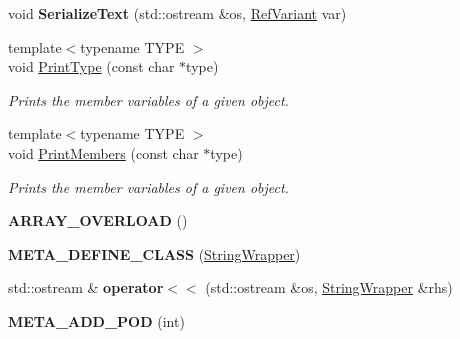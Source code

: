\begin{DoxyCompactItemize}
\item 
\hypertarget{namespaceDCEngine_a82cd4926cc0e797f4f74807cec2d5c18}{void {\bfseries Serialize\-Text} (std\-::ostream \&os, \hyperlink{classDCEngine_1_1RefVariant}{Ref\-Variant} var)}\label{namespaceDCEngine_a82cd4926cc0e797f4f74807cec2d5c18}

\item 
\hypertarget{namespaceDCEngine_ad026ffe481e698f2af8aee4f0810c5b3}{{\footnotesize template$<$typename T\-Y\-P\-E $>$ }\\void \hyperlink{namespaceDCEngine_ad026ffe481e698f2af8aee4f0810c5b3}{Print\-Type} (const char $\ast$type)}\label{namespaceDCEngine_ad026ffe481e698f2af8aee4f0810c5b3}

\begin{DoxyCompactList}\small\item\em Prints the member variables of a given object. \end{DoxyCompactList}\item 
\hypertarget{namespaceDCEngine_a10e521135488a4132ebc8e49b04bbc0a}{{\footnotesize template$<$typename T\-Y\-P\-E $>$ }\\void \hyperlink{namespaceDCEngine_a10e521135488a4132ebc8e49b04bbc0a}{Print\-Members} (const char $\ast$type)}\label{namespaceDCEngine_a10e521135488a4132ebc8e49b04bbc0a}

\begin{DoxyCompactList}\small\item\em Prints the member variables of a given object. \end{DoxyCompactList}\item 
\hypertarget{namespaceDCEngine_a957bc3c9baf7dade57667227593467fa}{{\bfseries A\-R\-R\-A\-Y\-\_\-\-O\-V\-E\-R\-L\-O\-A\-D} ()}\label{namespaceDCEngine_a957bc3c9baf7dade57667227593467fa}

\item 
\hypertarget{namespaceDCEngine_a9dfe18fc30da4523bf3c5af435a50a4a}{{\bfseries M\-E\-T\-A\-\_\-\-D\-E\-F\-I\-N\-E\-\_\-\-C\-L\-A\-S\-S} (\hyperlink{classDCEngine_1_1StringWrapper}{String\-Wrapper})}\label{namespaceDCEngine_a9dfe18fc30da4523bf3c5af435a50a4a}

\item 
\hypertarget{namespaceDCEngine_a0fa07cbb74a2efb257af0b45de8c4875}{std\-::ostream \& {\bfseries operator$<$$<$} (std\-::ostream \&os, \hyperlink{classDCEngine_1_1StringWrapper}{String\-Wrapper} \&rhs)}\label{namespaceDCEngine_a0fa07cbb74a2efb257af0b45de8c4875}

\item 
\hypertarget{namespaceDCEngine_a9ef3c34986f8395e44486e2b16bdc6c4}{{\bfseries M\-E\-T\-A\-\_\-\-A\-D\-D\-\_\-\-P\-O\-D} (int)}\label{namespaceDCEngine_a9ef3c34986f8395e44486e2b16bdc6c4}


\end{DoxyCompactItemize}
